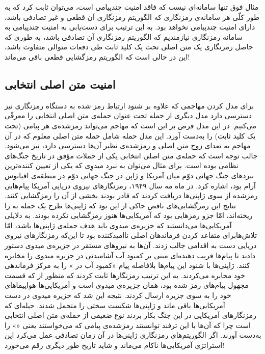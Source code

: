 مثال فوق تنها سامانه‌ای نیست که فاقد امنیت چندپیامی است، می‌توان ثابت کرد 
\cite{katz2014introduction}
که به طور کلّی هر سامانه‌ی رمزنگاری که الگوریتم رمزنگاری آن قطعی  و غیر تصادفی باشد، دارای امنیت چندپیامی نخواهد بود. به این ترتیب  برای دست‌یابی به امنیت چندپیامی به سامانه‌  رمزنگاری نیازمندیم که الگوریتم رمزنگاری آن تصادفی باشد، به طوری که حاصل رمزنگاری یک متن اصلی تحت یک کلید ثابت طی دفعات متوالی متفاوت باشد، این در حالی است که الگوریتم رمزگشایی قطعی باقی می‌ماند!


\subsection*{امنیت متن اصلی انتخابی}
برای مدل کردن مهاجمی که علاوه بر شنود  ارتباط رمز شده به دستگاه رمزنگاری نیز دسترسی دارد مدل دیگری از حمله تحت عنوان حمله‌ی متن اصلی انتخابی 
را معرفّی می‌کنیم. در این مدل فرض بر این است که مهاجم می‌تواند رمز‌شده‌ی هر پیامی (تحت یک کلید ثابت) را به‌دست  آورد. این مدل حمله شامل  حمله متن اصلی معلوم
که در آن مهاجم به تعدای زوج متن اصلی و رمز‌شده‌ی نظیر آن‌ها دسترسی دارد، نیز می‌شود. جالب توجه  است که حمله‌ی متن اصلی انتخابی یکی از حملات مؤفق در تاریخ جنگ‌های نظامی بوده است. برای مثال می‌توان به نبرد میدوِی
که یکی از تعیین کننده‌ترین نبردهای جنگ جهانی دوّم میان آمریکا و ژاپن در جنگ جهانی دوّم در منطقه‌ی اقیانوس آرام بود، اشاره کرد. در ماه مه سال ۱۹۴۹، رمزنگارهای نیروی دریایی آمریکا پیام‌هایی رمز‌شده از سوی ژاپنی‌ها دریافت کردند که قادر بودند بخشی از آن را رمزگشایی کنند. نتایج این رمزگشایی‌های ناقص حاکی از این بود که ژاپنی‌ها طرح یک حمله به 
را ریخته‌اند، امّا 
جزو رمزهایی بود که آمریکایی‌ها هنوز رمزگشایی نکرده بودند. به دلایلی آمریکایی‌ها می‌دانستند که جزیره‌ی میدوی باید هدف حمله‌ی ژاپنی‌ها باشد، امّا تلاش‌هابرای متقاعد کردن فرماندهان اصلی ناامیدکننده بود تا این‌که رمزنگارهای نیروی دریایی دست به اقدامی جالب زدند. آن‌ها به نیروهای مستقر در جزیره‌ی میدوی دستور دادند تا پیام‌ها فریب دهنده‌ای مبنی بر کمبود آب آشامیدنی در جزیره میدوی را مخابره کنند. ژاپنی‌ها با شنود این پیام‌ها بلافاصله پیام 
«کمبود آب در 
	»
را به مرکز فرماندهی خود مخابره می‌کردند. به این ترتیب رمزنگارها ثابت کردند که منظور از 
که قسمت مجهول پیام‌های رمز شده بود، همان جزیره‌ی میدوی است و آمریکایی‌ها هواپیماهای خود را به سوی جزیره ارسال کردند. نتیجه این شد که جزیره میدوی در دست آمریکایی‌ها باقی ماند و ژاپنی‌ها شکست سختی را متحمل شدند. حیله‌ای که رمزنگارهای آمریکایی در این جنگ بکار بردند نوع ضعیفی از حمله‌ی متن اصلی انتخابی است چرا که آن‌ها با این ترفند توانستند رمز‌شده‌ی پیامی که می‌خواستند یعنی 
«»
را به‌دست  آورند. اگر الگوریتم‌های رمزنگاری ژاپنی‌ها در آن زمان تصادفی عمل می‌کرد این استراتژی آمریکایی‌ها ناکام می‌ماند و شاید تاریخ طور دیگری رقم می‌خورد!


